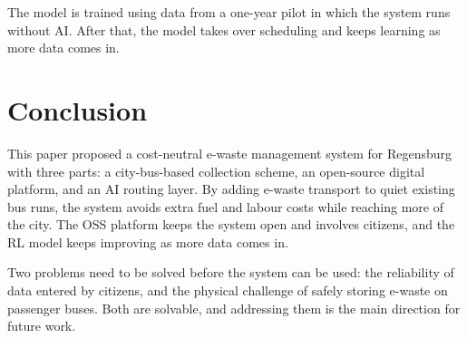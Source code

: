 \documentclass[12pt, a4paper]{article}
\begin{document}
The model is trained using data from a one-year pilot in which the system runs
without AI. After that, the model takes over scheduling and keeps learning
as more data comes in.

\section{Conclusion}

This paper proposed a cost-neutral e-waste management system for Regensburg
with three parts: a city-bus-based collection scheme, an open-source digital
platform, and an AI routing layer. By adding e-waste transport to quiet existing
bus runs, the system avoids extra fuel and labour costs while reaching more of
the city. The OSS platform keeps the system open and involves citizens, and the
RL model keeps improving as more data comes in.

Two problems need to be solved before the system can be used: the reliability
of data entered by citizens, and the physical challenge of safely storing e-waste
on passenger buses. Both are solvable, and addressing them is the main direction
for future work.

\newpage


\end{document}

